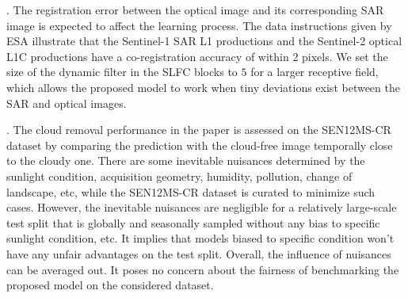 \documentclass[a4paper,fleqn]{cas-dc}
\begin{document}
\begin{table}[!t]
    \small
    \centering
    \caption{Performance of proposed algorithm with use of despeckled SAR data.}
    \label{despeckled-table}
    \vspace{-5mm}
\end{table}

.
The registration error between the optical image and its corresponding SAR image is expected to affect the learning process. The data instructions given by ESA illustrate that the Sentinel-1 SAR L1 productions and the Sentinel-2 optical L1C productions have a co-registration accuracy of within 2 pixels. We set the size of the dynamic filter in the SLFC blocks to $5$ for a larger receptive field, which allows the proposed model to work when tiny deviations exist between the SAR and optical images. 

.  The cloud removal performance in the paper is assessed on the SEN12MS-CR dataset by comparing the prediction with the cloud-free image temporally close to the cloudy one. There are some inevitable nuisances determined by the sunlight condition, acquisition geometry, humidity, pollution, change of landscape, etc, while the SEN12MS-CR dataset is curated to minimize such cases. However, the inevitable nuisances are negligible for a relatively large-scale test split that is globally and seasonally sampled without any bias to specific sunlight condition, etc. It implies that models biased to specific condition won't have any unfair advantages on the test split. Overall, the influence of nuisances can be averaged out. It poses no concern about the fairness of benchmarking the proposed model on the considered dataset. 
\end{document}
